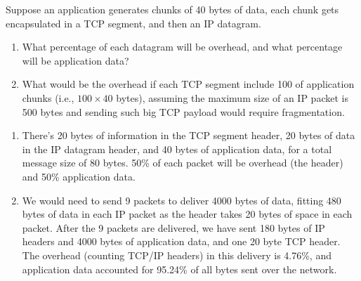 \documentclass{report}
\begin{document}
\mktitle


\begin{problem}

Suppose an application generates chunks of 40 bytes of data, each chunk gets encapsulated in a TCP segment, and then an IP datagram.

\begin{enumerate}
\item What percentage of each datagram will be overhead, and what percentage will be application data?

\item What would be the overhead if each TCP segment include 100 of application chunks (i.e., $100 \times 40$ bytes), assuming the maximum size of an IP packet is 500 bytes and sending such big TCP payload would require fragmentation.
\end{enumerate}


\begin{answer}{40em}
  \begin{enumerate}
    \item There's 20 bytes of information in the TCP segment header, 20 bytes of
          data in the IP datagram header, and 40 bytes of application data, for
          a total message size of 80 bytes. 50\% of each packet will be overhead
          (the header) and 50\% application data.

    \item We would need to send 9 packets to deliver 4000 bytes of data, fitting
          480 bytes of data in each IP packet as the header takes 20 bytes of
          space in each packet. After the 9 packets are delivered, we have sent
          180 bytes of IP headers and 4000 bytes of application data, and one
          20 byte TCP header. The overhead (counting TCP/IP headers) in this
          delivery is 4.76\%, and application data accounted for 95.24\% of all
          bytes sent over the network.
  \end{enumerate}
\end{answer}

\end{problem}
\end{document}

